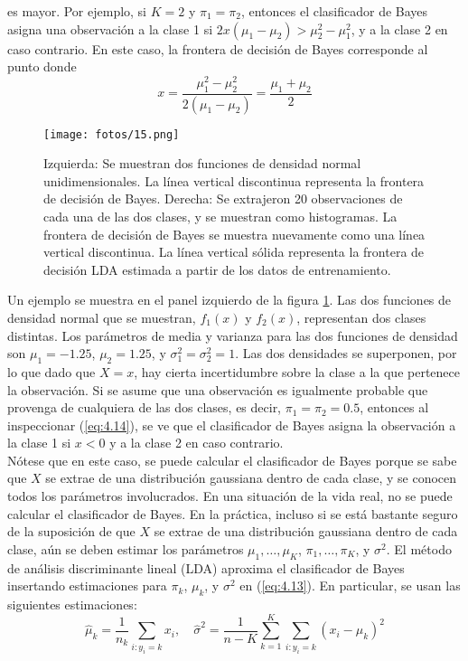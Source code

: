 \noindent es mayor. Por ejemplo, si $K = 2$ y $\pi_1 = \pi_2$, entonces el clasificador de Bayes asigna una observación a la clase 1 si $2x(\mu_1 - \mu_2) > \mu_2^2 - \mu_1^2$, y a la clase 2 en caso contrario. En este caso, la frontera de decisión de Bayes corresponde al punto donde
\begin{equation}
x = \frac{\mu_1^2 - \mu_2^2}{2(\mu_1 - \mu_2)} = \frac{\mu_1 + \mu_2}{2}
\label{eq:4.14}
\end{equation}

\begin{figure}[h]
\centering
\texttt{[image: fotos/15.png]}
\caption{Izquierda: Se muestran dos funciones de densidad normal unidimensionales. La línea vertical discontinua representa la frontera de decisión de Bayes. Derecha: Se extrajeron 20 observaciones de cada una de las dos clases, y se muestran como histogramas. La frontera de decisión de Bayes se muestra nuevamente como una línea vertical discontinua. La línea vertical sólida representa la frontera de decisión LDA estimada a partir de los datos de entrenamiento.}
\label{fig:4.4}
\end{figure}

Un ejemplo se muestra en el panel izquierdo de la figura \ref{fig:4.4}. Las dos funciones de densidad normal que se muestran, $f_1(x)$ y $f_2(x)$, representan dos clases distintas. Los parámetros de media y varianza para las dos funciones de densidad son $\mu_1 = -1.25$, $\mu_2 = 1.25$, y $\sigma^2_1 = \sigma^2_2 = 1$. Las dos densidades se superponen, por lo que dado que $X = x$, hay cierta incertidumbre sobre la clase a la que pertenece la observación. Si se asume que una observación es igualmente probable que provenga de cualquiera de las dos clases, es decir, $\pi_1 = \pi_2 = 0.5$, entonces al inspeccionar (\ref{eq:4.14}), se ve que el clasificador de Bayes asigna la observación a la clase 1 si $x < 0$ y a la clase 2 en caso contrario. \\

Nótese que en este caso, se puede calcular el clasificador de Bayes porque se sabe que $X$ se extrae de una distribución gaussiana dentro de cada clase, y se conocen todos los parámetros involucrados. En una situación de la vida real, no se puede calcular el clasificador de Bayes. En la práctica, incluso si se está bastante seguro de la suposición de que $X$ se extrae de una distribución gaussiana dentro de cada clase, aún se deben estimar los parámetros $\mu_1, \ldots, \mu_K$, $\pi_1, \ldots, \pi_K$, y $\sigma^2$. El método de análisis discriminante lineal (LDA) aproxima el clasificador de Bayes insertando estimaciones para $\pi_k$, $\mu_k$, y $\sigma^2$ en (\ref{eq:4.13}). En particular, se usan las siguientes estimaciones:
\begin{equation}
\hat{\mu}_k = \frac{1}{n_k} \sum_{i: y_i = k} x_i, \quad \hat{\sigma}^2 = \frac{1}{n - K} \sum_{k=1}^K \sum_{i: y_i = k} (x_i - \hat{\mu}_k)^2
\label{eq:4.15}
\end{equation}

